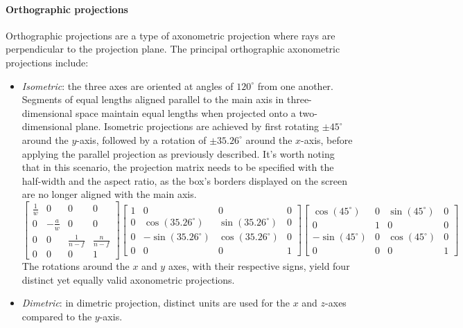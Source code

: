 \paragraph*{Orthographic projections}
Orthographic projections are a type of axonometric projection where rays are perpendicular to the projection plane.
The principal orthographic axonometric projections include:
\begin{itemize}
    \item \textit{Isometric}: the three axes are oriented at angles of $120^\circ$ from one another.
        Segments of equal lengths aligned parallel to the main axis in three-dimensional space maintain equal lengths when projected onto a two-dimensional plane.
        Isometric projections are achieved by first rotating $\pm 45^\circ$ around the $y$-axis, followed by a rotation of $\pm 35.26^\circ$ around the $x$-axis, before applying the parallel projection as previously described.
        It's worth noting that in this scenario, the projection matrix needs to be specified with the half-width and the aspect ratio, as the box's borders displayed on the screen are no longer aligned with the main axis. 
        \[\begin{bmatrix}
            \frac{1}{w} & 0 & 0 & 0 \\ 
            0 & -\frac{a}{w} & 0 & 0 \\ 
            0 & 0 & \frac{1}{n-f} & \frac{n}{n-f} \\ 
            0 & 0 & 0 & 1 
        \end{bmatrix}\begin{bmatrix}
            1 & 0 & 0 & 0 \\ 
            0 & \cos(35.26^\circ) & \sin(35.26^\circ) & 0 \\ 
            0 & -\sin(35.26^\circ) & \cos(35.26^\circ) & 0 \\ 
            0 & 0 & 0 & 1 
        \end{bmatrix}\begin{bmatrix}
            \cos(45^\circ) & 0 & \sin(45^\circ) & 0 \\ 
            0 & 1 & 0 & 0 \\ 
            -\sin(45^\circ) & 0 & \cos(45^\circ) & 0 \\ 
            0 & 0 & 0 & 1 
        \end{bmatrix}\]
        The rotations around the $x$ and $y$ axes, with their respective signs, yield four distinct yet equally valid axonometric projections.
    \item \textit{Dimetric}: in dimetric projection, distinct units are used for the $x$ and $z$-axes compared to the $y$-axis. 

\end{itemize}
